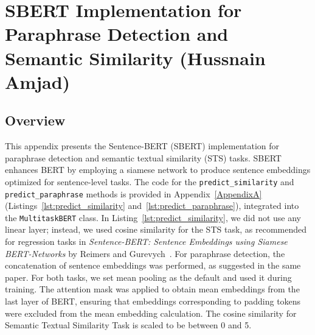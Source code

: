 
\chapter{SBERT Implementation for Paraphrase Detection and Semantic Similarity (Hussnain Amjad)}
\label{AppendixC}


\section{Overview}
This appendix presents the Sentence-BERT (SBERT) implementation for paraphrase detection and semantic textual similarity (STS) tasks. SBERT enhances BERT by employing a siamese network to produce sentence embeddings optimized for sentence-level tasks. The code for the \texttt{predict\_similarity} and \texttt{predict\_paraphrase} methods is provided in Appendix~\ref{AppendixA} (Listings~\ref{lst:predict_similarity} and~\ref{lst:predict_paraphrase}), integrated into the \texttt{MultitaskBERT} class. In Listing~\ref{lst:predict_similarity}, we did not use any linear layer; instead, we used cosine similarity for the STS task, as recommended for regression tasks in \textit{Sentence-BERT: Sentence Embeddings using Siamese BERT-Networks} by Reimers and Gurevych~\cite{reimers2019sentence}. For paraphrase detection, the concatenation of sentence embeddings was performed, as suggested in the same paper. For both tasks, we set mean pooling as the default and used it during training. The attention mask was applied to obtain mean embeddings from the last layer of BERT, ensuring that embeddings corresponding to padding tokens were excluded from the mean embedding calculation. The cosine similarity for Semantic Textual Similarity Task is scaled to be between 0 and 5.
